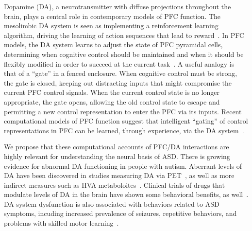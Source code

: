 Dopamine (DA), a neurotransmitter with diffuse projections throughout the brain, plays a central role in contemporary models of PFC function. The mesolimbic DA system is seen as implementing a reinforcement learning algorithm, driving the learning of action sequences that lead to reward~\cite{MontaguePR:1996:Dopamine,BartoAG:1994:TDLearning}. In PFC models, the DA system learns to adjust the state of PFC pyramidal cells, determining when cognitive control should be maintained and when it should be flexibly modified in order to succeed at the current task~\cite{BraverTS:2000:Control,RougierNP:2005:XT}. A useful analogy is that of a ``gate'' in a fenced enclosure. When cognitive control must be strong, the gate is closed, keeping out distracting inputs that might compromise the current PFC control signals. When the current control state is no longer appropriate, the gate opens, allowing the old control state to escape and permitting a new control representation to enter the PFC via its inputs.  Recent computational models of PFC function suggest that intelligent ``gating'' of control representations in PFC can be learned, through experience, via the DA system~\cite{RougierNP:2005:XT,RougierNP:2002:TaskSwitching}. 

We propose that these computational accounts of PFC/DA interactions are highly relevant for understanding the neural basis of ASD. There is growing evidence for abnormal DA functioning in people with autism. Aberrant levels of DA have been discovered in studies measuring DA via PET~\cite{FernellE:1997:AutismPET}, as well as more indirect measures such as HVA metaboloites~\cite{MartineauJ:1992:AutismDopamine}. Clinical trials of drugs that modulate levels of DA in the brain have shown some behavioral benefits, as well~\cite{PoseyDJ:2000:AutismDopamine,TsaiLY:1999:AutismDopamine}. DA system dysfunction is also associated with behaviors related to ASD symptoms, incuding increased prevalence of seizures, repetitive behaviors, and problems with skilled motor learning~\cite{RefWorks:1,RefWorks:3,RefWorks:5,RefWorks:2,RefWorks:109}.

